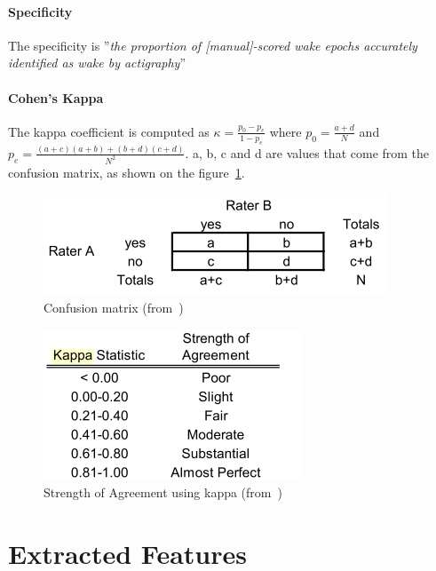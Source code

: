 \documentclass[a4paper,12pt]{article}
\begin{document}
\paragraph{Specificity} The specificity is ''\textit{the proportion of [manual]-scored wake epochs accurately identified as wake by actigraphy}''\cite{LisaJ.MeltzerHawleyE.Montgomery-DownsSalvatoreP.Insana2012} \\

\paragraph{Cohen's Kappa} The kappa coefficient is computed as $\kappa = \frac{p_0 - p_e}{1 - p_e}$ where $p_0 = \frac{a + d}{N}$ and $p_e = \frac{(a+c)(a+b) + (b+d)(c+d)}{N^2}$. a, b, c and d are values that come from the confusion matrix, as shown on the figure~\ref{kappa}.

\begin{figure}[H]
\centering
\includegraphics[scale=0.5]{Images/kappa.png}
\caption{Confusion matrix (from~\cite{Cunningham2009})}
\label{kappa}
\end{figure}

\begin{figure}[H]
\centering
\includegraphics[scale=0.5]{Images/kappa2.png}
\caption{Strength of Agreement using kappa (from~\cite{Cunningham2009})}
\end{figure}

\newpage

\section{Extracted Features}
\label{sec:extraFeatures}
\end{document}
